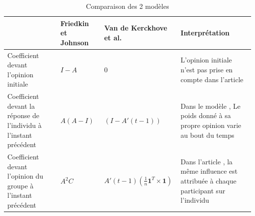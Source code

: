 \documentclass{scrreprt}
\begin{document}
\begin{table}
	\begin{tabular}{|p{3cm}|p{3.375cm}|p{3.375cm}|p{3.375cm}|}
		\hline
 & Friedkin et Johnson \cite{FJ} & Van de Kerckhove et al. \cite{VMG} & Interprétation \tabularnewline
		\hline
Coefficient devant l'opinion initiale & $I-A$ & $0$ & L'opinion initiale n'est pas prise en compte dans l'article \cite{VMG} \tabularnewline
		\hline
Coefficient devant la réponse de l'individu à l'instant précédent & $A(A-I)$ & $(I-A'(t-1))$ & Dans le modèle  \cite{VMG}, Le poids donné à sa propre opinion varie au bout du temps \tabularnewline
		\hline
Coefficient devant l'opinion du groupe à l'instant précédent & $A^{2}C$ & $A'(t-1)(\frac{1}{n} \textbf{1} ^T\times \textbf{1})$ & Dans l'article \cite{VMG}, la même influence est attribuée à chaque participant sur l'individu \tabularnewline
		\hline
	\end{tabular}
	\caption{Comparaison des 2 modèles}
\end{table}
\end{document}
